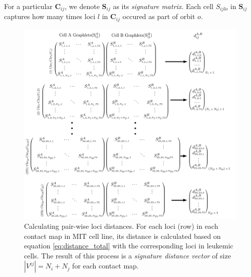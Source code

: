 \documentclass[]{article}
\begin{document}
For a particular
$\mathbf{C}_{ij}$, we denote $\mathbf{S}_{ij}$ as its \textit{signature 
matrix}. Each cell $S_{ijlo}$ in $\mathbf{S}_{ij}$ captures how many
times loci $l$ in $\mathbf{C}_{ij}$ occured as part of orbit $o$.


\begin{figure}
    \centering
    \includegraphics[width=\textwidth]{figures/graphlet_distance_schema.png}
    \caption{Calculating pair-wise loci distances. For each loci (row) 
    in each
    contact map in MIT cell line, its distance is calculated based on
    equation \ref{eq:distance_total} with the corresponding loci in
    leukemic cells. The result of this process is a 
    \textit{signature distance vector} of size
    $|V^{ij}| = N_i+N_j$ for each contact map.
    }
    \label{graphlet_distance_schema}
\end{figure}
\end{document}
